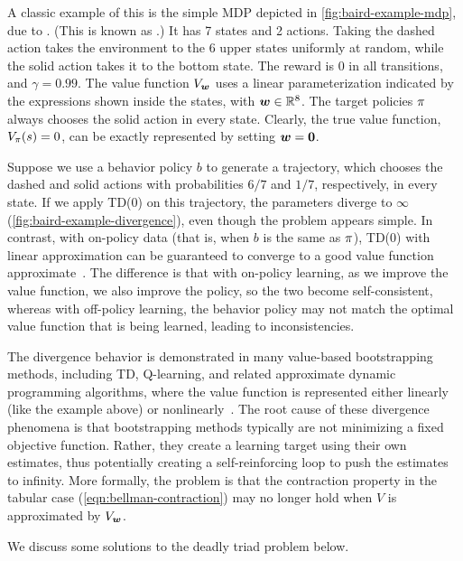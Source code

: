 A classic example of this is the simple MDP depicted
in \cref{fig:baird-example-mdp}, due to \citep{Baird95}.
(This is known as .)
It has 7 states and 2 actions.
Taking the dashed action takes the environment
to the 6 upper states uniformly at random,
while the solid action takes it to the bottom state.
The reward is 0 in all transitions,
and $\gamma=0.99$.
The value function $V_{{\bm{w}}}$ uses
a linear parameterization indicated by the expressions
shown inside the states, with ${\bm{w}}\in{\mathbb{R}}^8$.
The target policies $\pi$ always chooses the
solid action in every state.
Clearly, the true value function, $V_{\pi}(s) = 0$,
can be exactly represented by setting ${\bm{w}}=\boldsymbol{0}$.

Suppose we use a behavior policy $b$ to generate
a trajectory,
which chooses the dashed and solid actions
with probabilities $6/7$ and $1/7$, respectively,
in every state.
If we apply TD(0) on this trajectory,
the parameters diverge to $\infty$
(\cref{fig:baird-example-divergence}),
even though the problem appears simple.
In contrast, with on-policy data
(that is, when $b$ is the same as $\pi$),
TD(0) with linear approximation can be guaranteed to
converge to a good value function approximate~\citep{Tsitsiklis97}.
The difference is that with on-policy learning,
as we improve the value function, we also improve the policy,
so the two become self-consistent,
whereas with off-policy learning,
the behavior policy may not match the optimal
value function that is being learned,
leading to inconsistencies.


The divergence behavior is demonstrated in
many value-based bootstrapping methods, including TD, Q-learning,
and related approximate
dynamic programming algorithms,
where the value function is represented
either linearly (like the example above)
or nonlinearly~\citep{Gordon95,Tsitsiklis1997,Ostrovski2021}.
The root cause of these divergence phenomena
is that bootstrapping methods
typically are not minimizing a fixed objective function.  Rather, they
create a learning target using their own estimates, thus potentially
creating a self-reinforcing loop to push the estimates to infinity.
More formally, the problem is that
the contraction property in the tabular case
(\cref{eqn:bellman-contraction})
may no longer hold when $V$ is approximated by $V_{{\bm{w}}}$.

We discuss some solutions to the deadly triad problem below.


